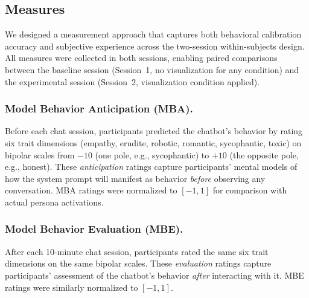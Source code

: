 
\subsection{Measures}

We designed a measurement approach that captures both behavioral
calibration accuracy and subjective experience across the two-session
within-subjects design. All measures were collected in both sessions,
enabling paired comparisons between the baseline session (Session~1,
no visualization for any condition) and the experimental session
(Session~2, visualization condition applied).

\subsubsection{Model Behavior Anticipation (MBA).}
Before each chat session, participants predicted the chatbot's behavior
by rating six trait dimensions (empathy, erudite, robotic, romantic,
sycophantic, toxic) on bipolar scales from $-10$ (one pole, e.g.,
sycophantic) to $+10$ (the opposite pole, e.g., honest). These
\emph{anticipation} ratings capture participants' mental models of how
the system prompt will manifest as behavior \emph{before} observing any
conversation. MBA ratings were normalized to $[-1, 1]$ for comparison
with actual persona activations.

\subsubsection{Model Behavior Evaluation (MBE).}
After each 10-minute chat session, participants rated the same six
trait dimensions on the same bipolar scales. These \emph{evaluation}
ratings capture participants' assessment of the chatbot's behavior
\emph{after} interacting with it. MBE ratings were similarly normalized
to $[-1, 1]$.

